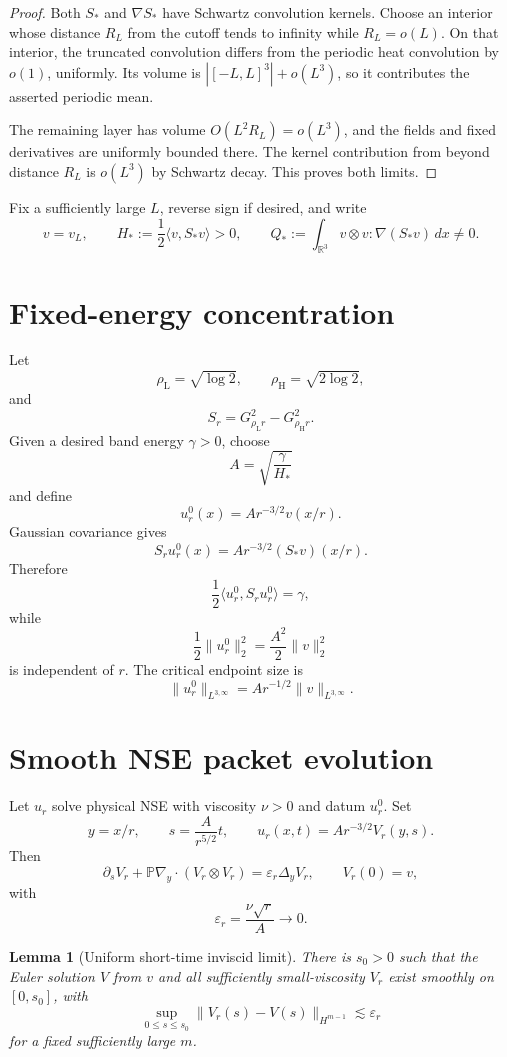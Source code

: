 \documentclass[11pt]{article}
\newtheorem{lemma}[theorem]{Lemma}
\theoremstyle{remark}
\newcommand{\R}{\mathbb R}
\begin{document}
\begin{proof}
Both \(S_*\) and \(\nabla S_*\) have Schwartz convolution kernels.
Choose an interior whose distance \(R_L\) from the cutoff tends to infinity
while \(R_L=o(L)\).  On that interior, the truncated convolution differs
from the periodic heat convolution by \(o(1)\), uniformly.  Its volume is
\(|[-L,L]^3|+o(L^3)\), so it contributes the asserted periodic mean.

The remaining layer has volume \(O(L^2R_L)=o(L^3)\), and the fields and
fixed derivatives are uniformly bounded there.  The kernel contribution
from beyond distance \(R_L\) is \(o(L^3)\) by Schwartz decay.  This proves
both limits.
\end{proof}

Fix a sufficiently large \(L\), reverse sign if desired, and write
\[
 v=v_L,\qquad
 H_*:=\frac12\langle v,S_*v\rangle>0,\qquad
 Q_*:=\int_{\R^3}v\otimes v:\nabla(S_*v)\,dx\ne0.
\]

\section{Fixed-energy concentration}

Let
\[
 \rho_{\mathrm L}=\sqrt{\log2},
 \qquad
 \rho_{\mathrm H}=\sqrt{2\log2},
\]
and
\[
 S_r=G_{\rho_{\mathrm L}r}^2-G_{\rho_{\mathrm H}r}^2.
\]
Given a desired band energy \(\gamma>0\), choose
\[
 A=\sqrt{\frac{\gamma}{H_*}}
\]
and define
\[
 u_r^0(x)=Ar^{-3/2}v(x/r).
\]
Gaussian covariance gives
\[
 S_ru_r^0(x)=Ar^{-3/2}(S_*v)(x/r).
\]
Therefore
\[
\boxed{
 \frac12\langle u_r^0,S_ru_r^0\rangle=\gamma,
}
\]
while
\[
 \frac12\|u_r^0\|_2^2
 =
 \frac{A^2}{2}\|v\|_2^2
\]
is independent of \(r\).  The critical endpoint size is
\[
\boxed{
 \|u_r^0\|_{L^{3,\infty}}
 =
 Ar^{-1/2}\|v\|_{L^{3,\infty}}.
}
\]

\section{Smooth NSE packet evolution}

Let \(u_r\) solve physical NSE with viscosity \(\nu>0\) and datum \(u_r^0\).
Set
\[
 y=x/r,\qquad
 s=\frac{A}{r^{5/2}}t,\qquad
 u_r(x,t)=Ar^{-3/2}V_r(y,s).
\]
Then
\[
 \partial_sV_r
 +\mathbb P\nabla_y\!\cdot(V_r\otimes V_r)
 =
 \varepsilon_r\Delta_yV_r,
 \qquad
 V_r(0)=v,
\]
with
\[
\boxed{
 \varepsilon_r=\frac{\nu\sqrt r}{A}\longrightarrow0.
}
\]

\begin{lemma}[Uniform short-time inviscid limit]
There is \(s_0>0\) such that the Euler solution \(V\) from \(v\) and all
sufficiently small-viscosity \(V_r\) exist smoothly on \([0,s_0]\), with
\[
 \sup_{0\le s\le s_0}
 \|V_r(s)-V(s)\|_{H^{m-1}}
 \lesssim\varepsilon_r
\]
for a fixed sufficiently large \(m\).
\end{lemma}
\end{document}
